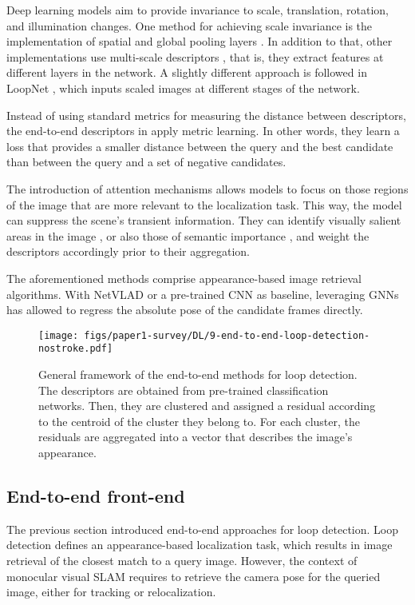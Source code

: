 Deep learning models aim to provide invariance to scale, translation, rotation, and illumination changes.
One method for achieving scale invariance is the implementation of spatial and global pooling layers \cite{zhu2018attention,ento-to-endloop,loopnet-attention}. In addition to that, other implementations use multi-scale descriptors \cite{arandjelovic2016netvlad,chen2018learningPR}, that is, they extract features at different layers in the network. A slightly different approach is followed in LoopNet \cite{loopnet-attention}, which inputs scaled images at different stages of the network.

Instead of using standard metrics for measuring the distance between descriptors, the end-to-end descriptors in \cite{ento-to-endloop,arandjelovic2016netvlad} apply metric learning. In other words, they learn a loss that provides a smaller distance between the query and the best candidate than between the query and a set of negative candidates.

The introduction of attention mechanisms allows models to focus on those regions of the image that are more relevant to the localization task. This way, the model can suppress the scene's transient information. 
They can identify visually salient areas in the image \cite{zhu2018attention}, or also those of semantic importance \cite{chen2018learningPR}, and weight the descriptors accordingly prior to their aggregation. 

The aforementioned methods comprise appearance-based image retrieval algorithms. With NetVLAD \cite{dl:loopclosure:relposegnn} or a pre-trained CNN \cite{dl:loop:li2021transcamp,dl:loopclosure:li2022gtcar} as baseline, leveraging \acp{GNN} has allowed to regress the absolute pose of the candidate frames directly. 

\begin{figure}[tb!]
  \centering
  \texttt{[image: figs/paper1-survey/DL/9-end-to-end-loop-detection-nostroke.pdf]}
  \caption[The framework for loop detection in end-to-end methods]{ General framework of the end-to-end methods for loop detection. The descriptors are obtained from pre-trained classification networks. Then, they are clustered and assigned a residual according to the centroid of the cluster they belong to. For each cluster, the residuals are aggregated into a vector that describes the image's appearance.}
  \label{fig:end2endloopdetection}
\end{figure}




\subsection{End-to-end front-end}
\label{sec:deeplearning:frontend}
The previous section introduced end-to-end approaches for loop detection. Loop detection defines an appearance-based localization task, which results in image retrieval of the closest match to a query image. However, the context of monocular visual \ac{SLAM} requires to retrieve the camera pose for the queried image, either for tracking or relocalization. 

